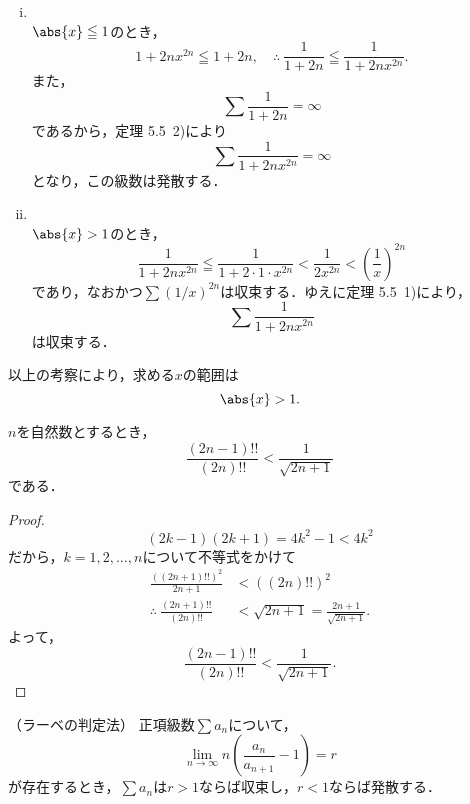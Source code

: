 \begin{tanswer}
    \begin{enumerate}[(i)]
        \item \mbox{　} \\
              $\abs{x} \leqq 1$のとき，
              \[
                  1 + 2nx^{2n} \leqq 1+2n ,\quad \therefore ~ \frac{1}{1+2n} \leqq \frac{1}{1+2nx^{2n}}.
              \]
              また，
              \[
                  \sum \frac{1}{1+2n} =\infty
              \]
              であるから，定理 5.5~2)により
              \[
                  \sum \frac{1}{1+2nx^{2n}} = \infty
              \]
              となり，この級数は発散する．
        \item \mbox{　}\\
              $\abs{x}>1$のとき，
              \[
                  \frac{1}{1+2n x^{2n}} \leqq \frac{1}{1+2 \cdot 1 \cdot x^{2n}} < \frac{1}{2x^{2n}} <\left( \frac{1}{x} \right)^{2n}
              \]
              であり，なおかつ$\sum ( 1/x )^{2n}$は収束する．ゆえに定理 5.5~1)により，
              \[
                  \sum \frac{1}{1+2nx^{2n}}
              \]
              は収束する．
    \end{enumerate}
    以上の考察により，求める$x$の範囲は
    \[
        \abs{x}>1.
    \]
\end{tanswer}




\begin{lemma}{}{}

    $n$を自然数とするとき，
    \[
        \frac{(2n-1)!!}{(2n)!!} < \frac{1}{\sqrt{2n+1}}
    \]
    である．
\end{lemma}

\begin{proof}
    \[
        (2k-1)(2k+1)  = 4k^2-1 < 4k^2
    \]
    だから，$ k=1,2,\ldots,n$について不等式をかけて
    \begin{align*}
        \frac{((2n+1)!!)^2}{2n+1}            & < ((2n)!!)^2                            \\
        \therefore ~ \frac{(2n+1)!!}{(2n)!!} & < \sqrt{2n+1}=\frac{2n+1}{\sqrt{2n+1}}.
    \end{align*}
    よって，
    \[
        \frac{(2n-1)!!}{(2n)!!} < \frac{1}{\sqrt{2n+1}}.
    \]
\end{proof}

\begin{lemma}{（ラーベの判定法）}{}
    正項級数$\sum a_n$について，
    \[
        \lim_{n\to\infty} n \left(\frac{a_n}{a_{n+1}}-1 \right) = r
    \]
    が存在するとき，$\sum a_n$は$r >1$ならば収束し，$r < 1$ならば発散する．
\end{lemma}


